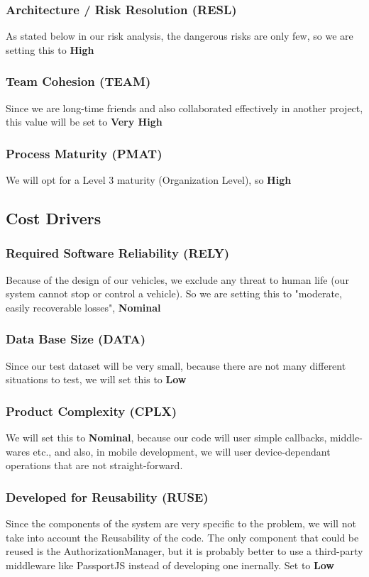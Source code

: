 \subsubsection{Architecture / Risk Resolution (RESL)} 
As stated below in our risk analysis, the dangerous risks are only few, so we are setting this to \textbf{High}
\subsubsection{Team Cohesion (TEAM)}
Since we are long-time friends and also collaborated effectively in another project, this value will be set to \textbf{Very High}
\subsubsection{Process Maturity (PMAT)}
We will opt for a Level 3 maturity (Organization Level), so \textbf{High}

\subsection{Cost Drivers}
\subsubsection{Required Software Reliability (RELY)}
Because of the design of our vehicles, we exclude any threat to human life (our system cannot stop or control a vehicle). So we are setting this to "moderate, easily recoverable losses", \textbf{Nominal}
\subsubsection{Data Base Size (DATA)}
Since our test dataset will be very small, because there are not many different situations to test, we will set this to \textbf{Low}
\subsubsection{Product Complexity (CPLX)}
We will set this to \textbf{Nominal}, because our code will user simple callbacks, middle-wares etc., and also, in mobile development, we will user device-dependant operations that are not straight-forward. 
\subsubsection{Developed for Reusability (RUSE)}
Since the components of the system are very specific to the problem, we will not take into account the Reusability of the code. The only component that could be reused is the AuthorizationManager, but it is probably better to use a third-party middleware like PassportJS instead of developing one inernally. Set to \textbf{Low}
